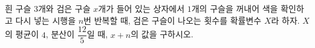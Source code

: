 흰 구슬 $3$개와 검은 구슬 $x$개가 들어 있는 상자에서 $1$개의 구슬을 꺼내어 색을 확인하고 다시 넣는 시행을 $n$번 반복할 때, 검은 구슬이 나오는 횟수를 확률변수 $X$라 하자. $X$의 평균이 $4$, 분산이 $\dfrac{12}{5}$일 때, $x+n$의 값을 구하시오.
